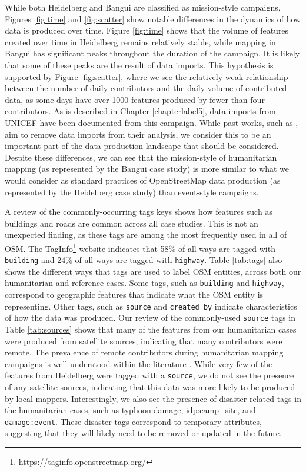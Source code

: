While both Heidelberg and Bangui are classified as mission-style campaigns, Figures \ref{fig:time} and \ref{fig:scatter} show notable differences in the dynamics of how data is produced over time. Figure \ref{fig:time} shows that the volume of features created over time in Heidelberg remains relatively stable, while mapping in Bangui has significant peaks throughout the duration of the campaign. It is likely that some of these peaks are the result of data imports. This hypothesis is supported by Figure \ref{fig:scatter}, where we see the relatively weak relationship between the number of daily contributors and the daily volume of contributed data, as some days have over 1000 features produced by fewer than four contributors. As is described in Chapter \ref{chapterlabel5}, data imports from UNICEF have been documented from this campaign. While past works, such as \textcite{ahmouda_analyzing_2018}, aim to remove data imports from their analysis, we consider this to be an important part of the data production landscape that should be considered. Despite these differences, we can see that the mission-style of humanitarian mapping (as represented by the Bangui case study) is more similar to what we would consider as standard practices of OpenStreetMap data production (as represented by the Heidelberg case study) than event-style campaigns.

A review of the commonly-occurring tags keys shows how features such as buildings and roads are common across all case studies. This is not an unexpected finding, as these tags are among the most frequently used in all of OSM. The TagInfo\footnote{\url{https://taginfo.openstreetmap.org/}} website indicates that 58\% of all ways are tagged with \texttt{building} and 24\% of all ways are tagged with \texttt{highway}. Table \ref{tab:tags} also shows the different ways that tags are used to label OSM entities, across both our humanitarian and reference cases. Some tags, such as \texttt{building} and \texttt{highway}, correspond to geographic features that indicate what the OSM entity is representing. Other tags, such as \texttt{source} and \texttt{created_by} indicate characteristics of how the data was produced. Our review of the commonly-used \texttt{source} tags in Table \ref{tab:sources} shows that many of the features from our humanitarian cases were produced from satellite sources, indicating that many contributors were remote. The prevalence of remote contributors during humanitarian mapping campaigns is well-understood within the literature \parencite{dittus_mass_2017, eckle_quality_2015}. While very few of the features from Heidelberg were tagged with a \texttt{source}, we do not see the presence of any satellite sources, indicating that this data was more likely to be produced by local mappers. Interestingly, we also see the presence of disaster-related tags in the humanitarian cases, such as \texttt{}{typhoon:damage, idp:camp_site}, and \texttt{damage:event}. These disaster tags correspond to temporary attributes, suggesting that they will likely need to be removed or updated in the future. \\

